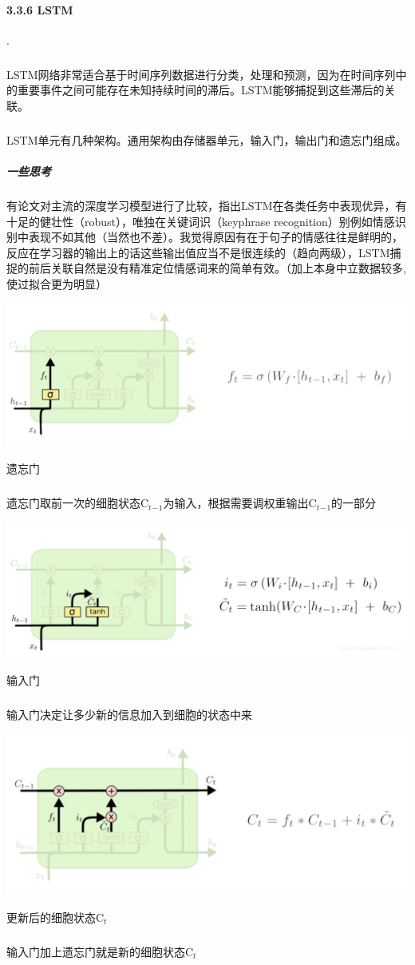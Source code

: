 \documentclass[UTF8]{article}
\begin{document}



\paragraph{\large 3.3.6 LSTM}.
\subparagraph{}LSTM网络非常适合基于时间序列数据进行分类，处理和预测，因为在时间序列中的重要事件之间可能存在未知持续时间的滞后。LSTM能够捕捉到这些滞后的关联。
\subparagraph{}LSTM单元有几种架构。通用架构由存储器单元，输入门，输出门和遗忘门组成。
\subparagraph{一些思考} 有论文对主流的深度学习模型进行了比较，指出LSTM在各类任务中表现优异，有十足的健壮性（robust），唯独在关键词识（keyphrase recognition）别例如情感识别中表现不如其他（当然也不差）。我觉得原因有在于句子的情感往往是鲜明的，反应在学习器的输出上的话这些输出值应当不是很连续的（趋向两级），LSTM捕捉的前后关联自然是没有精准定位情感词来的简单有效。（加上本身中立数据较多,使过拟合更为明显）


\begin{center} %
\includegraphics[width=0.8\linewidth]{1.PNG}
\end{center}
\centerline{遗忘门}
\subparagraph{}遗忘门取前一次的细胞状态C$_t$$_-$$_1$为输入，根据需要调权重输出C$_t$$_-$$_1$的一部分

\begin{center}
\includegraphics[width=0.8\linewidth]{2.PNG}
\end{center}
\centerline{输入门}
\subparagraph{}输入门决定让多少新的信息加入到细胞的状态中来

\begin{center}
\includegraphics[width=0.8\linewidth]{3.PNG}
\end{center}
\centerline{更新后的细胞状态C$_t$}
\subparagraph{}输入门加上遗忘门就是新的细胞状态C$_t$
\end{document}
